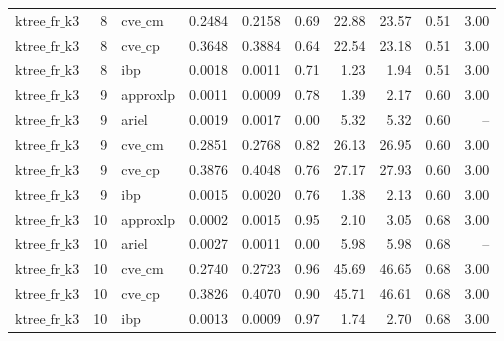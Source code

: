 \begin{table}[ht]
\begin{tabular}{lrlrrrrrrr}
$\text{ktree\_fr\_k3}$ & 8 & $\text{cve\_cm}$ & 0.2484 & 0.2158 & 0.69 & 22.88 & 23.57 & 0.51 & 3.00 \\
$\text{ktree\_fr\_k3}$ & 8 & $\text{cve\_cp}$ & 0.3648 & 0.3884 & 0.64 & 22.54 & 23.18 & 0.51 & 3.00 \\
$\text{ktree\_fr\_k3}$ & 8 & ibp & 0.0018 & 0.0011 & 0.71 & 1.23 & 1.94 & 0.51 & 3.00 \\
$\text{ktree\_fr\_k3}$ & 9 & approxlp & 0.0011 & 0.0009 & 0.78 & 1.39 & 2.17 & 0.60 & 3.00 \\
$\text{ktree\_fr\_k3}$ & 9 & ariel & 0.0019 & 0.0017 & 0.00 & 5.32 & 5.32 & 0.60 & -- \\
$\text{ktree\_fr\_k3}$ & 9 & $\text{cve\_cm}$ & 0.2851 & 0.2768 & 0.82 & 26.13 & 26.95 & 0.60 & 3.00 \\
$\text{ktree\_fr\_k3}$ & 9 & $\text{cve\_cp}$ & 0.3876 & 0.4048 & 0.76 & 27.17 & 27.93 & 0.60 & 3.00 \\
$\text{ktree\_fr\_k3}$ & 9 & ibp & 0.0015 & 0.0020 & 0.76 & 1.38 & 2.13 & 0.60 & 3.00 \\
$\text{ktree\_fr\_k3}$ & 10 & approxlp & 0.0002 & 0.0015 & 0.95 & 2.10 & 3.05 & 0.68 & 3.00 \\
$\text{ktree\_fr\_k3}$ & 10 & ariel & 0.0027 & 0.0011 & 0.00 & 5.98 & 5.98 & 0.68 & -- \\
$\text{ktree\_fr\_k3}$ & 10 & $\text{cve\_cm}$ & 0.2740 & 0.2723 & 0.96 & 45.69 & 46.65 & 0.68 & 3.00 \\
$\text{ktree\_fr\_k3}$ & 10 & $\text{cve\_cp}$ & 0.3826 & 0.4070 & 0.90 & 45.71 & 46.61 & 0.68 & 3.00 \\
$\text{ktree\_fr\_k3}$ & 10 & ibp & 0.0013 & 0.0009 & 0.97 & 1.74 & 2.70 & 0.68 & 3.00 \\
\bottomrule
\end{tabular}
\end{table}

